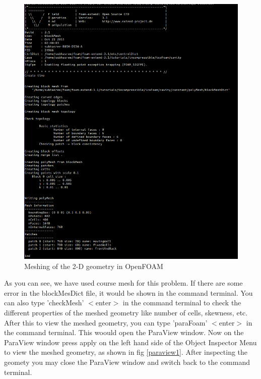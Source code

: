 \documentclass[a4paper,12pt]{report}
\begin{document}
\begin{figure}[ht]  
\begin{center}  
\includegraphics[scale=0.7]{blockMesh.png}
\caption{Meshing of the 2-D geometry in OpenFOAM}
\label{blockmesh}
\end{center}  
\end{figure}

\flushleft As you can see, we have used course mesh for this problem. If there are some error in the blockMesDict file, it would be shown in the command terminal. You can also type 'checkMesh' $<$enter$>$ in the command terminal to check the different properties of the meshed geometry like number of cells, skewness, etc. 
\flushleft After this to view the meshed geometry, you can type 'paraFoam' $<$enter$>$ in the command terminal. This woould open the ParaView window. Now on the ParaView window press apply on the left hand side of the Object Inspector Menu to view the meshed geometry, as shown in fig \ref{paraview1}. After inspecting the geomety you may close the ParaView window and switch back to the command terminal.
\end{document}
